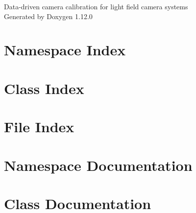 \documentclass[twoside]{book}
\newcommand{\+}{\discretionary{\mbox{\scriptsize$\hookleftarrow$}}{}{}}
\newcommand{\clearemptydoublepage}{%
    \newpage{\pagestyle{empty}\cleardoublepage}%
  }
\begin{document}
  \raggedbottom
    \hypersetup{pageanchor=false,
                bookmarksnumbered=true,
                pdfencoding=unicode
               }
  \begin{titlepage}
  \vspace*{7cm}
  \begin{center}%
  {\Large Data-\/driven camera calibration for light field camera systems}\\
  \vspace*{1cm}
  {\large Generated by Doxygen 1.12.0}\\
  \end{center}
  \end{titlepage}
  \clearemptydoublepage
  \tableofcontents
  \clearemptydoublepage
  \hypersetup{pageanchor=true}
\chapter{Namespace Index}

\chapter{Class Index}

\chapter{File Index}

\chapter{Namespace Documentation}













\chapter{Class Documentation}





\end{document}
